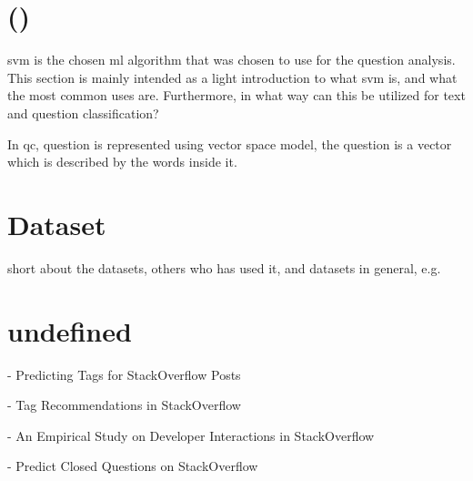 \section[SVM]{ ()}
\label{sec:svm}
\gls{svm} is the chosen \gls{ml} algorithm that was chosen to use for the question analysis. 
This section is mainly intended as a light introduction to what \gls{svm} is, and what the most common uses are. 
Furthermore, in what way can this be utilized for text and question classification?

In \gls{qc}, question is represented using vector space model, the question is a vector which is described by the words inside it. 
\cite{Loni2011}


\section{Dataset}
\label{sec:dataset}
short about the datasets, others who has used it, and datasets in general, e.g. 
\cite{Klein2016,SpaceMachine.net2016,Wissner-Gross2016}









\section{undefined}
\label{sec:undefined}

\textcite{Stanley2013} - Predicting Tags for StackOverflow Posts

\textcite{Short2014} - Tag Recommendations in StackOverflow

\textcite{Wang2013} - An Empirical Study on Developer Interactions in StackOverflow

\textcite{Lezina2013} - Predict Closed Questions on StackOverflow
